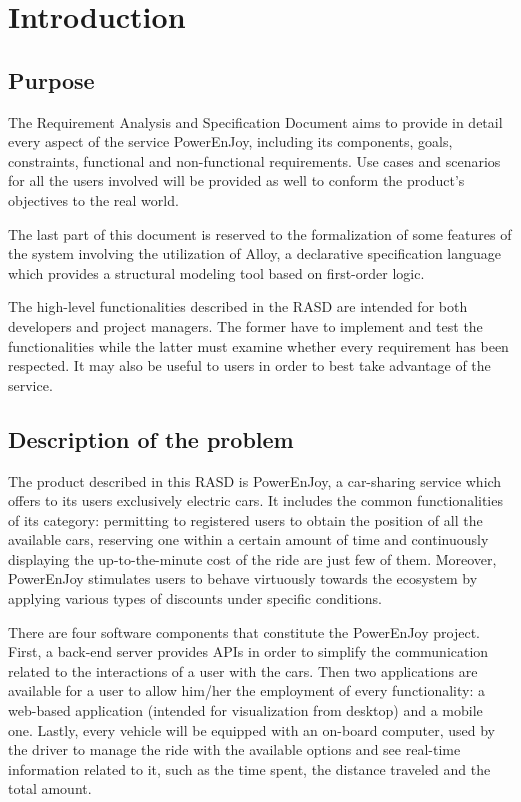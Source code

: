\chapter{Introduction}

\section{Purpose}
The Requirement Analysis and Specification Document aims to provide in detail every aspect of the service PowerEnJoy, including its components, goals, constraints, functional and non-functional requirements. Use cases and scenarios for all the users involved will be provided as well to conform the product's objectives to the real world.

The last part of this document is reserved to the formalization of some features of the system involving the utilization of Alloy, a declarative specification language which provides a structural modeling tool based on first-order logic.

The high-level functionalities described in the RASD are intended for both developers and project managers. The former have to implement and test the functionalities while the latter must examine whether every requirement has been respected. It may also be useful to users in order to best take advantage of the service.

\section{Description of the problem}
The product described in this RASD is PowerEnJoy, a car-sharing service which offers to its users exclusively electric cars. It includes the common functionalities of its category: permitting to registered users to obtain the position of all the available cars, reserving one within a certain amount of time and continuously displaying the up-to-the-minute cost of the ride are just few of them. Moreover, PowerEnJoy stimulates users to behave virtuously towards the ecosystem by applying various types of discounts under specific conditions.

There are four software components that constitute the PowerEnJoy project. First, a back-end server provides APIs in order to simplify the communication related to the interactions of a user with the cars. Then two applications are available for a user to allow him/her the employment of every functionality: a web-based application (intended for visualization from desktop) and a mobile one. Lastly, every vehicle will be equipped with an on-board computer, used by the driver to manage the ride with the available options and see real-time information related to it, such as the time spent, the distance traveled and the total amount.

